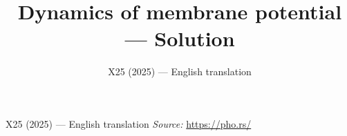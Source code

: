 \documentclass[11pt,a4paper]{article}
\title{\textbf{Dynamics of membrane potential --- Solution}}
\author{\normalsize X25 (2025) — English translation}
\date{}
\begin{document}
\maketitle
X25 (2025) — English translation
\vspace{1em}
\noindent\textit{Source:} \url{https://pho.rs/}
\end{document}

